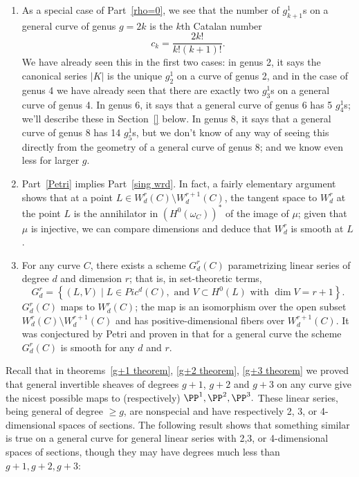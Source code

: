 \begin{remark}
\begin{enumerate}
\item As a special case of Part~\ref{rho=0}, we see that the number of $g^1_{k+1}$s on a general curve of genus $g = 2k$ is the $k$th Catalan number 
$$
c_k = \frac{2k!}{k!(k+1)!}.
$$
We have already seen this in the first two cases: in genus 2, it says the canonical series $|K|$ is the unique $g^1_2$ on a curve of genus 2, and in the case of genus 4 we have already seen  that there are exactly two $g^1_3$s on a general curve of genus 4. In genus 6, it says that a general curve of genus 6 has 5 $g^1_4$s; we'll describe these in Section~\ref{} below.  In genus 8, it says that a general curve of genus 8 has 14 $g^1_5$s, but we don't know of any way of seeing this directly from the geometry of a general curve of genus 8; and we know even less for larger $g$.

\item Part~\ref{Petri} implies Part~\ref{sing wrd}. In fact, a fairly elementary argument shows that at a point $L \in W^r_d(C) \setminus W^{r+1}_d(C)$, the tangent space to $W^r_d$ at the point $L$ is the annihilator
in $(H^0(\omega_C))^*$ of the image of $\mu$; given that $\mu$ is injective, we can compare dimensions and deduce that $W^r_d$ is smooth at $L$.

\item For any curve $C$, there exists a scheme $G^r_d(C)$ parametrizing linear series of degree $d$ and dimension $r$; that is, in set-theoretic terms,
$$
G^r_d = \left\{ (L, V) \mid L \in Pic^d(C), \text{ and } V \subset H^0(L) \text{ with } \dim V = r+1 \right\}.
$$
$G^r_d(C)$ maps to $W^r_d(C)$; the map is an isomorphism over the open subset $W^r_d(C) \setminus W^{r+1}_d(C)$ and has positive-dimensional fibers over $W^{r+1}_d(C)$. It was conjectured
by Petri and proven in \cite{Gieseker-Petri} that for a general curve the scheme $G^r_d(C)$ is smooth for any $d$ and $r$.
\end{enumerate}
\end{remark}


Recall that  in theorems~\ref{g+1 theorem}, \ref{g+2 theorem}, \ref{g+3 theorem} we proved that
general invertible sheaves of degrees $g+1$, $g+2$ and $g+3$ on any curve
give the nicest possible maps to (respectively) $\PP^1, \PP^2, \PP^3.$ These
linear series, being general of degree $\geq g$, are  nonspecial and have respectively
2, 3, or 4-dimensional spaces of sections. The following result shows that something
similar is true on a general curve for general linear series with 2,3, or 4-dimensional
spaces of sections, though they may have degrees much less than $g+1, g+2, g+3$:

